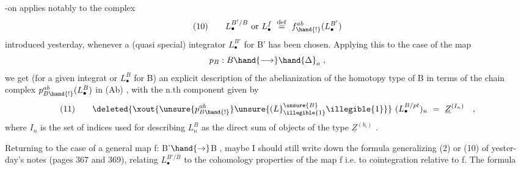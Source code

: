 -on applies notably to the complex
\[ (10) \qquad L_{\bullet}^{B'/B} \text{ or } L_{\bullet}^{f} \ \overset{\mathrm{def}}{=}\ f^{ab}_{\hand{!}}(L_{\bullet}^{B'}) \]
introduced yesterday, whenever a (quasi special) integrator $L_{\bullet}^{B'}$ for B'
has been chosen. Applying this to the case of the map
\[ p_{B} : B \hand{\longrightarrow} \hand{\Delta}_{o} \ , \]
we get  (for a given integrat or $L_{\bullet}^{B}$ for B) an explicit description of
the abelianization of the homotopy type of B  in terms of the
chain complex $p^{ab}_{B\hand{!}}(L_{\bullet}^{B})$ in (Ab) , with the n.th component given by
\[ (11) \qquad \deleted{\xout{\unsure{p^{ab}_{B\hand{!}}}\unsure{(L}_{\illegible{1}}^{\unsure{B}}\illegible{1}}} \ (L_{\bullet}^{B/pt})_{n} \ = \ \underline{Z}^{(I_{n})} \quad , \]
where $I_{n}$ is the set of indices used for describing $L_{n}^{B}$ as the direct
sum of objects of the type $\underline{Z}^{(b_{i})}$ .

Returning to the case of a general  map f: B'$\hand{\rightarrow}$B , maybe I
should still write down the formula generalizing (2) or (10) of yester-%
day's notes (pages 367 and 369), relating $L_{\bullet}^{B'/B}$ to the cohomology
properties of the map f i.e. to cointegration relative to f. The formula


